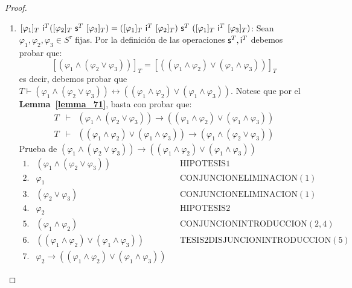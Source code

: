 \begin{proof}
\begin{enumerate}[(1)]
      \item $[\varphi_{1}]_{T} \ \IN^{T}([\varphi_{2}]_{T} \ \SU^{T} \ [\varphi_{3}]_{T}) = ([\varphi_{1}]_{T} \ \IN^{T}
        \ [\varphi_{2}]_{T}) \ \SU^{T} \  ([\varphi_{1}]_{T} \ \IN^{T} \ [\varphi_{3}]_{T})$: Sean $\varphi_{1},
        \varphi_{2}, \varphi_{3} \in S^{\tau}$ fijas. Por la definición de las operaciones $\mathsf{s}^{T}, \mathsf{i}^{T}$ debemos
        probar que:
          \[
            [(\varphi_{1} \wedge (\varphi_{2} \vee \varphi_{3}))]_{T} = [((\varphi_{1} \wedge \varphi_{2}) \vee
            (\varphi_{1} \wedge \varphi_{3}))]_{T}
          \]
          \PN es decir, debemos probar que $T \vdash (\varphi_{1} \wedge (\varphi_{2} \vee \varphi_{3})) \leftrightarrow
          ((\varphi_{1} \wedge \varphi_{2}) \vee (\varphi_{1} \wedge \varphi_{3}))$. Notese que por el
          \textbf{Lemma~\ref{lemma_71}}, basta con probar que:
          \[
            \begin{array}{rcl}
              T & \vdash & (\varphi_{1} \wedge (\varphi_{2} \vee \varphi_{3})) \rightarrow ((\varphi_{1} \wedge
                \varphi_{2}) \vee (\varphi_{1} \wedge \varphi_{3})) \\
              T & \vdash & ((\varphi_{1} \wedge \varphi_{2}) \vee (\varphi_{1} \wedge \varphi_{3})) \rightarrow
                (\varphi_{1} \wedge (\varphi_{2} \vee \varphi_{3}))
            \end{array}
          \]
          \PN Prueba de $(\varphi_{1} \wedge (\varphi_{2} \vee \varphi_{3})) \rightarrow ((\varphi_{1} \wedge
          \varphi_{2}) \vee (\varphi_{1} \wedge \varphi_{3}))$
          \[
            \begin{array}{llll}
              1. & (\varphi_{1} \wedge (\varphi_{2} \vee \varphi_{3})) && \text{HIPOTESIS1} \\
              2. & \varphi_{1} && \text{CONJUNCIONELIMINACION}(1) \\
              3. & (\varphi_{2} \vee \varphi_{3}) && \text{CONJUNCIONELIMINACION}(1) \\
              4. & \varphi_{2} && \text{HIPOTESIS2} \\
              5. & (\varphi_{1} \wedge \varphi_{2}) && \text{CONJUNCIONINTRODUCCION}(2,4) \\
              6. & ((\varphi_{1} \wedge \varphi_{2}) \vee (\varphi_{1} \wedge \varphi_{3})) &&
                \text{TESIS2DISJUNCIONINTRODUCCION}(5) \\
              7. & \varphi_{2} \rightarrow ((\varphi_{1} \wedge \varphi_{2}) \vee (\varphi_{1} \wedge \varphi_{3})) &&

\end{array}\]
\end{enumerate}
\end{proof}
